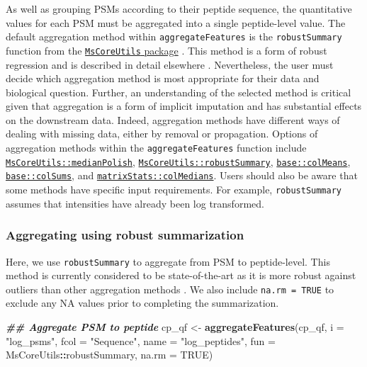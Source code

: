 \documentclass[9pt,a4paper,]{extarticle}
\newenvironment{Shaded}{\begin{snugshade}}{\end{snugshade}}
\newcommand{\AttributeTok}[1]{\textcolor[rgb]{0.13,0.29,0.53}{#1}}
\newcommand{\ConstantTok}[1]{\textcolor[rgb]{0.56,0.35,0.01}{#1}}
\newcommand{\DocumentationTok}[1]{\textcolor[rgb]{0.56,0.35,0.01}{\textbf{\textit{#1}}}}
\newcommand{\FunctionTok}[1]{\textcolor[rgb]{0.13,0.29,0.53}{\textbf{#1}}}
\newcommand{\NormalTok}[1]{#1}
\newcommand{\OtherTok}[1]{\textcolor[rgb]{0.56,0.35,0.01}{#1}}
\newcommand{\SpecialCharTok}[1]{\textcolor[rgb]{0.81,0.36,0.00}{\textbf{#1}}}
\newcommand{\StringTok}[1]{\textcolor[rgb]{0.31,0.60,0.02}{#1}}
\begin{document}
As well as grouping PSMs according to their peptide sequence, the quantitative
values for each PSM must be aggregated into a single peptide-level value. The
default aggregation method within \texttt{aggregateFeatures} is the \texttt{robustSummary}
function from the
\href{https://bioconductor.org/packages/release/bioc/html/MsCoreUtils.html}{\texttt{MsCoreUtils} package}
\citep{Rainer2022}. This method is a form of robust regression and is described in
detail elsewhere \citep{Sticker2020}. Nevertheless, the user must decide which
aggregation method is most appropriate for their data and biological question.
Further, an understanding of the selected method is critical given that
aggregation is a form of implicit imputation and has substantial effects on the
downstream data. Indeed, aggregation methods have different ways of dealing with
missing data, either by removal or propagation. Options of aggregation methods
within the \texttt{aggregateFeatures} function include
\href{https://rdrr.io/bioc/MsCoreUtils/man/medianPolish.html}{\texttt{MsCoreUtils::medianPolish}},
\href{https://rdrr.io/bioc/MsCoreUtils/man/robustSummary.html}{\texttt{MsCoreUtils::robustSummary}},
\href{https://www.rdocumentation.org/packages/base/versions/3.6.2/topics/colSums}{\texttt{base::colMeans}},
\href{https://www.rdocumentation.org/packages/base/versions/3.6.2/topics/colSums}{\texttt{base::colSums}},
and \href{https://rdrr.io/rforge/matrixStats/man/rowMedians.html}{\texttt{matrixStats::colMedians}}.
Users should also be aware that some methods have specific input requirements.
For example, \texttt{robustSummary} assumes that intensities have already been log
transformed.

\hypertarget{aggregating-using-robust-summarization}{%
\subsubsection{Aggregating using robust summarization}\label{aggregating-using-robust-summarization}}

Here, we use \texttt{robustSummary} to aggregate from PSM to peptide-level. This method
is currently considered to be state-of-the-art as it is more robust against
outliers than other aggregation methods \citep{Sticker2020, Goeminne2016}. We also
include \texttt{na.rm\ =\ TRUE} to exclude any NA values prior to completing the
summarization.

\begin{Shaded}
\begin{Highlighting}[]
\DocumentationTok{\#\# Aggregate PSM to peptide}
\NormalTok{cp\_qf }\OtherTok{\textless{}{-}} \FunctionTok{aggregateFeatures}\NormalTok{(cp\_qf,}
                           \AttributeTok{i =} \StringTok{"log\_psms"}\NormalTok{,}
                           \AttributeTok{fcol =} \StringTok{"Sequence"}\NormalTok{,}
                           \AttributeTok{name =} \StringTok{"log\_peptides"}\NormalTok{,}
                           \AttributeTok{fun =}\NormalTok{ MsCoreUtils}\SpecialCharTok{::}\NormalTok{robustSummary,}
                           \AttributeTok{na.rm =} \ConstantTok{TRUE}\NormalTok{)}
\end{Highlighting}
\end{Shaded}
\end{document}
